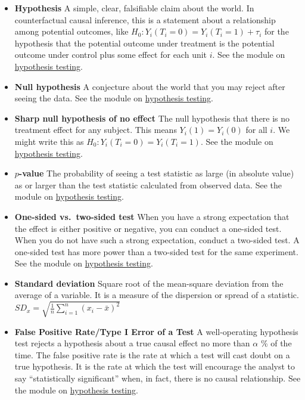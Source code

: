 \documentclass[12pt,]{book}
\providecommand{\tightlist}{%
  \setlength{\itemsep}{0pt}\setlength{\parskip}{0pt}}
\begin{document}
\begin{itemize}
\tightlist
\item
  \textbf{Hypothesis} A simple, clear, falsifiable claim about the world. In
  counterfactual causal inference, this is a statement about a relationship
  among potential outcomes, like \(H_0: Y_i(T_i=0) = Y_i(T_i=1) + \tau_i\) for
  the hypothesis that the potential outcome under treatment is the
  potential outcome under control plus some effect for each unit \(i\). See the
  module on \href{hypothesis-testing.html}{hypothesis testing}.
\item
  \textbf{Null hypothesis} A conjecture about the world that you may reject after
  seeing the data. See the module on \href{hypothesis-testing.html}{hypothesis testing}.
\item
  \textbf{Sharp null hypothesis of no effect} The null hypothesis that there is no
  treatment effect for any subject. This means \(Y_i(1)=Y_i(0)\) for all \(i\). We
  might write this as \(H_0: Y_i(T_i=0) = Y_i(T_i=1)\). See the module on
  \href{hypothesis-testing.html}{hypothesis testing}.
\item
  \textbf{\(p\)-value} The probability of seeing a test statistic as large (in absolute value) as or larger than the test statistic calculated from observed data. See the module on \href{hypothesis-testing.html}{hypothesis testing}.
\item
  \textbf{One-sided vs.~two-sided test} When you have a strong expectation that the
  effect is either positive or negative, you can conduct a one-sided test.
  When you do not have such a strong expectation, conduct a two-sided test. A
  one-sided test has more power than a two-sided test for the same experiment.
  See the module on \href{hypothesis-testing.html}{hypothesis testing}.
\item
  \textbf{Standard deviation} Square root of the mean-square deviation from the average of a variable. It is a measure of the dispersion or spread of a statistic.
  \(SD_x=\sqrt{\frac{1}{n}\sum_{i=1}^n(x_i-\bar{x})^2}\)
\item
  \textbf{False Positive Rate/Type I Error of a Test} A well-operating hypothesis
  test rejects a hypothesis about a true causal effect no more than \(\alpha\) \%
  of the time. The false positive rate is the rate at which a test will cast
  doubt on a true hypothesis. It is the rate at which the test will encourage the analyst to say ``statistically significant'' when, in fact, there is no causal relationship. See the module on \href{hypothesis-testing.html}{hypothesis testing}.

\end{itemize}
\end{document}
